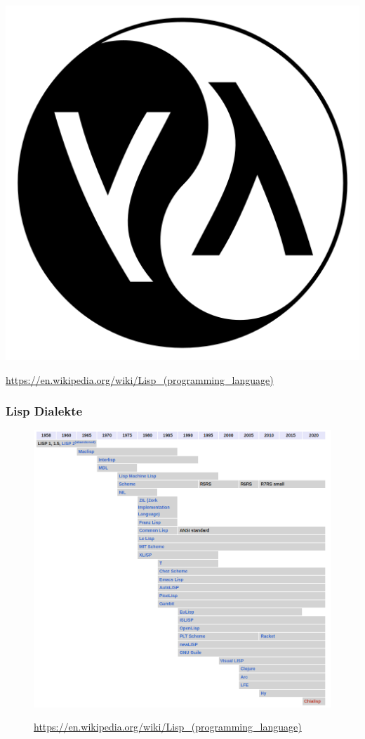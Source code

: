 \documentclass{beamer}
\begin{document}
\begin{frame}
		\includegraphics[scale=0.1]{bilder/lisp.png}
	   
	\textmd{\url{https://en.wikipedia.org/wiki/Lisp_(programming_language)}}
\end{frame}

\begin{frame}
\frametitle{Lisp Dialekte}
	\begin{figure}
	    \centering
	    \includegraphics[width=0.7\linewidth]{bilder/lisphis.png}

            \textmd{ \tiny \url{https://en.wikipedia.org/wiki/Lisp_(programming_language)}}
	\end{figure}
\end{frame}
\end{document}
